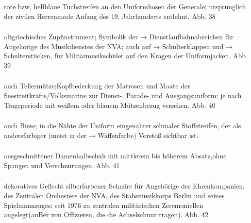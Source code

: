 rote bzw, hellblaue Tuchstreifen an den Uniformhosen der Generale; ursprünglich der zivilen Herrenmode Anfang des 19. Jahrhunderts entlehnt. Abb. 38

\subsubsection*{}%

altgriechisches Zupfinstrument; Symbolik der → Dienstlaufbahnabzeichen für Angehörige des Musikdienstes der NVA; auch auf → Schulterklappen und → Schulterstücken, für Militärmusikschüler auf den Kragen der Uniformjacken. Abb. 39

\subsubsection*{}%

auch Tellermütze;Kopfbedeckung der Matrosen und Maate der Seestreitkräfte/Volksmarine zur Dienst-, Parade- und Ausgangsuniform; je nach Trageperiode mit weißem oder blauem Mützenbezug versehen. Abb. 40

\subsubsection*{}%

auch Biese; in die Nähte der Uniform eingenähter schmaler Stoffstreifen, der als andersfarbiger (meist in der → Waffenfarbe) Vorstoß sichtbar ist.

\subsubsection*{}%

ausgeschnittener Damenhalbschuh mit mittlerem bis höherem Absatz,ohne Spangen und Verschnürungen. Abb. 41

\subsubsection*{}%

dekoratives Geflecht silberfarbener Schnüre für Angehörige der Ehrenkompanien, des Zentralen Orchesters der NVA, des Stabsmusikkorps Berlin und seines Spielmannzuges; seit 1976 zu zentralen militärischen Zeremoniellen angelegt(auBer von Offizieren, die die Achselschnur tragen). Abb. 42

\subsubsection*{}%

